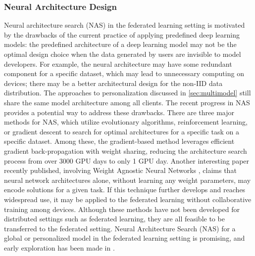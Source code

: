 \documentclass[11pt]{article}
\begin{document}
\subsubsection{Neural Architecture Design}
Neural architecture search (NAS) in the federated learning setting is motivated by the drawbacks of the current practice of applying predefined deep learning models: the predefined architecture of a deep learning model may not be the optimal design choice when the data generated by users are invisible to model developers. For example, the neural architecture may have some redundant component for a specific dataset, which may lead to unnecessary computing on devices; there may be a better architectural design for the non-IID data distribution. The approaches to personalization discussed in \cref{sec:multimodel} still share the same model architecture among all clients.
The recent progress in NAS \cite{MiLeNAS2020,real2017large,elsken2018efficient,real2019regularized,Bello2016Neural,pham2018efficient,liu2018darts,xie2018snas,elsken2018efficient,luo2018neural} provides a potential way to address these drawbacks. There are three major methods for NAS, which utilize evolutionary algorithms, reinforcement learning, or gradient descent to search for optimal architectures for a specific task on a specific dataset. Among these, the gradient-based method leverages efficient gradient back-propagation with weight sharing, reducing the architecture search process from over 3000 GPU days to only 1 GPU day. 
Another interesting paper recently published, involving Weight Agnostic Neural Networks \cite{gaier2019weight}, claims that neural network architectures alone, without learning any weight parameters, may encode solutions for a given task. If this technique further develops and reaches widespread use, it may be applied to the federated learning without collaborative training among devices.
Although these methods have not been developed for distributed settings such as federated learning, they are all feasible to be transferred to the federated setting. Neural Architecture Search (NAS) for a global or personalized model in the federated learning setting is promising, and early exploration has been made in \citep{he2020fednas}.

\end{document}
